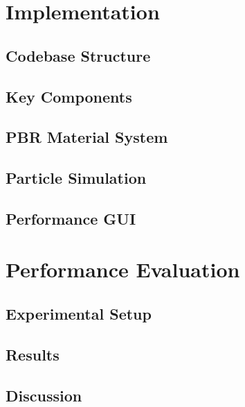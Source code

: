 \documentclass[12pt,a4paper,openright,twoside]{book}
\begin{document}
\chapter{Implementation}
\label{chap:implementation}

\section{Codebase Structure}

\section{Key Components}

\section{PBR Material System}

\section{Particle Simulation}

\section{Performance GUI}

\chapter{Performance Evaluation}
\label{chap:evaluation}

\section{Experimental Setup}

\section{Results}

\section{Discussion}

\label{chap:conclusions}
\end{document}
